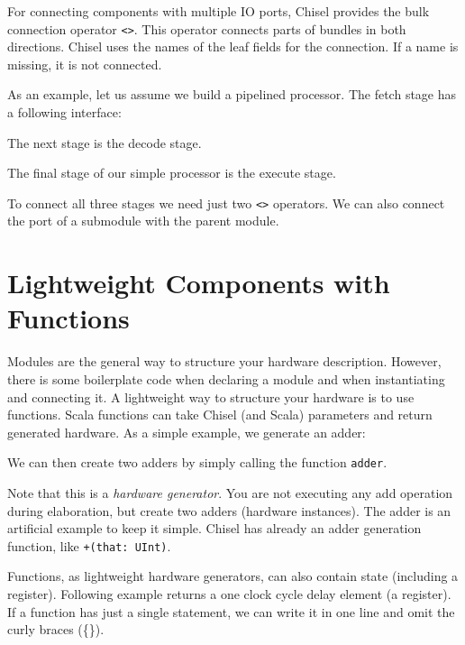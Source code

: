 \documentclass[%
    10pt,
    headinclude, footexclude,
    openright, %
    notitlepage,
    cleardoubleempty,
    headsepline,
    pointlessnumbers,
    bibtotoc, idxtotoc,
    ]{scrbook}
\newcommand{\code}[1]{{\small{\texttt{#1}}}}
\begin{document}

For connecting components with multiple IO ports, Chisel provides the
bulk connection operator \code{<>}. This operator connects parts of bundles
in both directions. Chisel uses the names of the leaf fields for the connection.
If a name is missing, it is not connected.

As an example, let us assume we build a pipelined processor. The fetch
stage has a following interface:

\noindent The next stage is the decode stage.

\noindent The final stage of our simple processor is the execute stage.

To connect all three stages we need just two \code{<>} operators.
We can also connect the port of a submodule with the parent module.


\section{Lightweight Components with Functions}
\label{sec:functions}


Modules are the general way to structure your hardware description.
However, there is some boilerplate code when declaring a module and when instantiating and
connecting it.
A lightweight way to structure your hardware is to use functions.
Scala functions can take Chisel (and Scala) parameters and return generated hardware.
As a simple example, we generate an adder:


\noindent We can then create two adders by simply calling the function \code{adder}.


\noindent Note that this is a \emph{hardware generator}. You are not executing any add operation
during elaboration, but create two adders (hardware instances). The adder is an artificial example
to keep it simple. Chisel has already an adder generation function, like \code{+(that: UInt)}.

Functions, as lightweight hardware generators, can also contain state (including a register).
Following example returns a one clock cycle delay element (a register).
If a function has just a single statement, we can write it in one line and omit the curly
braces (\{\}).
\end{document}
